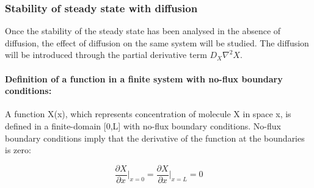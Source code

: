 %
%
%
%
%
%
%
%
%


\subsubsection{Stability of steady state with diffusion}
Once the stability of the steady state has been analysed in the absence of diffusion, the effect of diffusion on the same system will be studied.
The diffusion will be introduced through the partial derivative term $D_{X}\nabla^2 X$.




\paragraph{Definition of a function in a finite system with no-flux boundary conditions:}
A function X(x), which represents concentration of molecule X in space x, is defined in a finite-domain [0,L] with no-flux boundary conditions.
No-flux boundary conditions imply that the derivative of the function at the boundaries is zero:

\begin{equation}
    \frac{\partial X}{\partial x}\Bigg|_{x=0} = \frac{\partial X}{\partial x}\Bigg|_{x=L} = 0
\end{equation}


